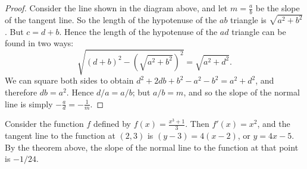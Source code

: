 \begin{proof}
  Consider the line shown in the diagram above, and let $ m = \frac{a}{b} $ be the slope of the tangent line.
  So the length of the hypotenuse of the $ ab $ triangle is $ \sqrt{a^2 + b^2} $. But $ c = d + b $. Hence the length
  of the hypotenuse of the $ ad $ triangle can be found in two ways:
  \begin{displaymath}
    \sqrt{(d + b)^2 - \left(\sqrt{a^2 + b^2}\right)^2} = \sqrt{a^2 + d^2}.
  \end{displaymath}
  We can square both sides to obtain $ d^2 + 2db + b^2 - a^2 - b^2 = a^2 + d^2 $, and therefore $ db = a^2 $.
  Hence $ d/a = a/b $; but $ a/b = m $, and so the slope of the normal line is simply $ -\frac{a}{d} = -\frac{1}{m} $.
\end{proof}

\begin{ex}
  Consider the function $ f $ defined by $ f(x) = \frac{x^3 + 1}{3} $. Then $ f'(x) = x^2 $, and the tangent line
  to the function at $ (2, 3) $ is $ (y - 3) = 4(x - 2) $, or $ y = 4x - 5 $. By the theorem above,
  the slope of the normal line to the function at that point is $ -1/24 $.

  \begin{center}
  \end{center}
\end{ex}

\clearpage
